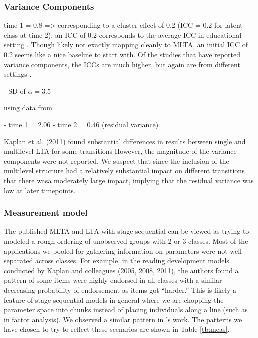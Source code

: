 \documentclass[man, noextraspace, floatsintext, 12pt]{apa7}
\begin{document}
\subsubsection{Variance Components}

time 1 = 0.8 => corresponding to a cluster effect of 0.2 (ICC = 0.2 for latent class at time 2).
an ICC of 0.2 corresponds to the average ICC in educational setting \citep{Hedges2007}.
Though likely not exactly mapping cleanly to MLTA, an initial ICC of 0.2 seems like a nice baseline to start with.
Of the studies that have reported variance components, the ICCs are much higher, but again are from different settings \citep{Vermunt2010, Asparouhov2008}.


\citep{Vermunt2010}
- SD of $\alpha=3.5$


\citep{Asparouhov2008}
using data from \citep{Muthen2002}

- time 1 = 2.06
- time 2 = 0.46 (residual variance)

Kaplan et al. (2011) 
found substantial differences in results between single and multilevel LTA for some transitions 
However, the magnitude of the variance components were not reported.
We suspect that since the inclusion of the multilevel structure had a relatively substantial impact on different transitions that there wasa moderately large impact, implying that the residual variance was low at later timepoints.

\subsubsection{Measurement model}

The published MLTA and LTA with stage sequential can be viewed as trying to modeled a rough ordering of unobserved groups with 2-or 3-classes.
Most of the applications we pooled for gathering information on parameters were not well separated across classes.
For example, in the reading development models conducted by Kaplan and colleagues (2005, 2008, 2011), the authors found a pattern of some items were highly endorsed in all classes with a similar decreasing probability of endorsement as items got ``harder.''
This is likely a feature of stage-sequential models in general where we are chopping the parameter space into chunks instead of placing individuals along a line (such as in factor analysis).
We observed a similar pattern in \textcite{Auerbach2006, Vermunt2010}'s work.
The patterns we have chosen to try to reflect these scenarios are shown in Table \ref{tb:meas}.
\end{document}
